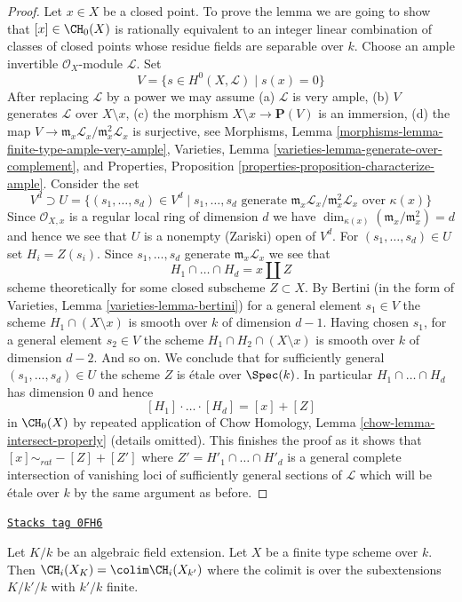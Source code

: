\begin{proof}
\medskip\noindent
Let $x \in X$ be a closed point. To prove the lemma we are going to show that
$[x] \in \CH_0(X)$ is rationally equivalent to an integer linear
combination of classes of closed points whose residue fields
are separable over $k$. Choose an ample invertible
$\mathcal{O}_X$-module $\mathcal{L}$. Set
$$
V = \{s \in H^0(X, \mathcal{L}) \mid s(x) = 0 \}
$$
After replacing $\mathcal{L}$ by a power we may assume
(a) $\mathcal{L}$ is very ample, (b) $V$ generates
$\mathcal{L}$ over $X \setminus x$, (c) the morphism
$X \setminus x \to \mathbf{P}(V)$ is an immersion, (d)
the map $V \to \mathfrak m_x\mathcal{L}_x/\mathfrak m_x^2\mathcal{L}_x$
is surjective, see
Morphisms, Lemma \ref{morphisms-lemma-finite-type-ample-very-ample},
Varieties, Lemma \ref{varieties-lemma-generate-over-complement}, and
Properties, Proposition \ref{properties-proposition-characterize-ample}.
Consider the set
$$
V^d \supset U =
\{
(s_1, \ldots, s_d) \in V^d \mid s_1, \ldots, s_d
\text{ generate }
\mathfrak m_x\mathcal{L}_x/\mathfrak m_x^2\mathcal{L}_x
\text{ over }\kappa(x)
\}
$$
Since $\mathcal{O}_{X, x}$ is a regular local ring of dimension $d$
we have $\dim_{\kappa(x)}(\mathfrak m_x/\mathfrak m_x^2) = d$
and hence we see that $U$ is a nonempty (Zariski) open of $V^d$.
For $(s_1, \ldots, s_d) \in U$ set $H_i = Z(s_i)$. Since
$s_1, \ldots, s_d$ generate $\mathfrak m_x\mathcal{L}_x$
we see that
$$
H_1 \cap \ldots \cap H_d = x \amalg Z
$$
scheme theoretically for some closed subscheme $Z \subset X$.
By Bertini (in the form of Varieties, Lemma \ref{varieties-lemma-bertini})
for a general element $s_1 \in V$ the scheme $H_1 \cap (X \setminus x)$
is smooth over $k$ of dimension $d - 1$.
Having chosen $s_1$, for a general element
$s_2 \in V$ the scheme $H_1 \cap H_2 \cap (X \setminus x)$
is smooth over $k$ of dimension $d - 2$. And so on.
We conclude that for sufficiently general
$(s_1, \ldots, s_d) \in U$ the scheme $Z$ is \'etale over $\Spec(k)$.
In particular $H_1 \cap \ldots \cap H_d$ has dimension $0$
and hence
$$
[H_1] \cdot \ldots \cdot [H_d] = [x] + [Z]
$$
in $\CH_0(X)$ by repeated application of
Chow Homology, Lemma \ref{chow-lemma-intersect-properly} (details omitted).
This finishes the proof as it shows that $[x] \sim_{rat} - [Z] + [Z']$
where $Z' = H'_1 \cap \ldots \cap H'_d$ is a general complete
intersection of vanishing loci of sufficiently general sections
of $\mathcal{L}$ which will be \'etale over $k$ by the same argument
as before.
\end{proof}

\begin{lemma}
\label{weil-lemma-chow-limit}
\href{https://stacks.math.columbia.edu/tag/0FH6}{\texttt{Stacks tag 0FH6}}

Let $K/k$ be an algebraic field extension. Let $X$ be a finite type
scheme over $k$. Then $\CH_i(X_K) = \colim \CH_i(X_{k'})$ where the
colimit is over the subextensions $K/k'/k$ with $k'/k$ finite.
\end{lemma}

